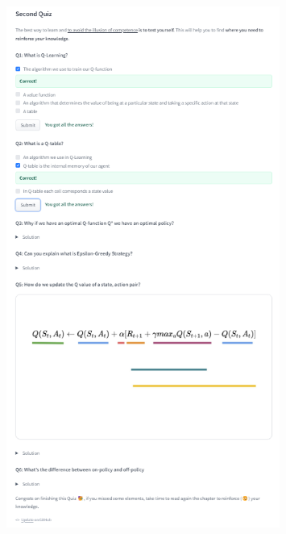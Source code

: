 \begin{homeworkProblem}
\begin{figure}[H]
    \includegraphics[width=0.8\textwidth]{../Img/Huggingface_DRL/unit2_quiz.png}
\end{figure}
\begin{figure}[H]
    \centering

\end{figure}
\end{homeworkProblem}

